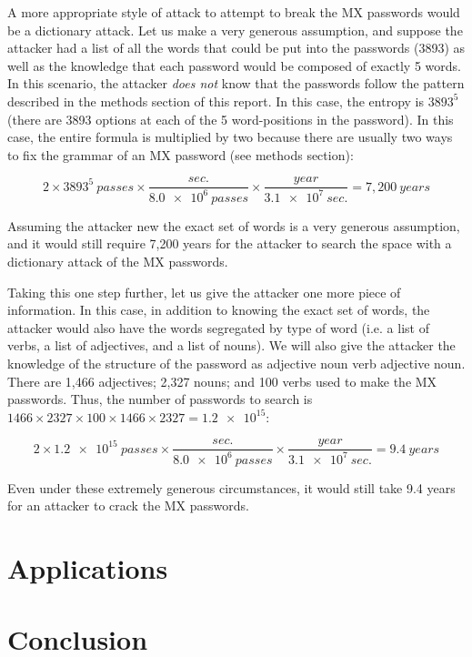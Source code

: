 \documentclass{article}
\begin{document}
A more appropriate style of attack to attempt to break the MX passwords would be a dictionary attack. Let us make a very generous assumption, and suppose the attacker had a list of all the words that could be put into the passwords (3893) as well as the knowledge that each password would be composed of exactly 5 words. In this scenario, the attacker \emph{does not} know that the passwords follow the pattern described in the methods section of this report. In this case, the entropy is $3893^5$ (there are 3893 options at each of the 5 word-positions in the password). In this case, the entire formula is multiplied by two because there are usually two ways to fix the grammar of an MX password (see methods section):

$$2 \times 3893^5~passes \times \frac{sec.}{\num{8.0e6}~passes} \times \frac{year}{\num{3.1e7}~sec.} = 7,200~years$$

Assuming the attacker new the exact set of words is a very generous assumption, and it would still require 7,200 years for the attacker to search the space with a dictionary attack of the MX passwords. 

Taking this one step further, let us give the attacker one more piece of information. In this case, in addition to knowing the exact set of words, the attacker would also have the words segregated by type of word (i.e. a list of verbs, a list of adjectives, and a list of nouns). We will also give the attacker the knowledge of the structure of the password as adjective noun verb adjective noun. There are 1,466 adjectives; 2,327 nouns; and 100 verbs used to make the MX passwords. Thus, the number of passwords to search is $1466 \times 2327 \times 100 \times 1466 \times 2327 = \num{1.2e15}$:

$$2 \times \num{1.2e15}~passes \times \frac{sec.}{\num{8.0e6}~passes} \times \frac{year}{\num{3.1e7}~sec.} = 9.4~years$$

Even under these extremely generous circumstances, it would still take 9.4 years for an attacker to crack the MX passwords.

\FloatBarrier
\section*{Applications}

\section*{Conclusion}

\FloatBarrier
\end{document}

